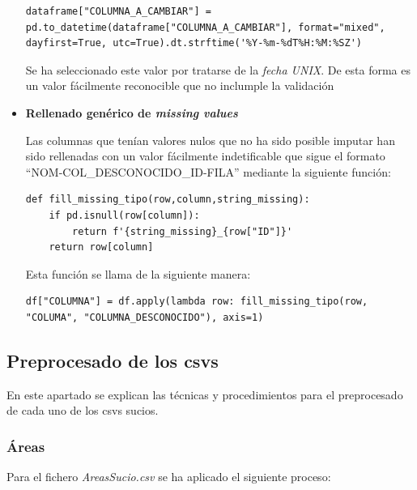 \documentclass[]{article}
\begin{document}
\begin{itemize}
    \begin{lstlisting}
dataframe["COLUMNA_A_CAMBIAR"] = pd.to_datetime(dataframe["COLUMNA_A_CAMBIAR"], format="mixed", dayfirst=True, utc=True).dt.strftime('%Y-%m-%dT%H:%M:%SZ')
    \end{lstlisting}

    Se ha seleccionado este valor por tratarse de la \textit{fecha UNIX}. De
    esta forma es un valor fácilmente reconocible que no inclumple la validación
    \item \textbf{Rellenado genérico de \textit{missing values}}
    
    Las columnas que tenían valores nulos que no ha sido posible imputar han sido rellenadas con un valor fácilmente indetificable que sigue el formato ``NOM-COL\_DESCONOCIDO\_ID-FILA'' mediante la siguiente función:

    \begin{lstlisting}
def fill_missing_tipo(row,column,string_missing):
    if pd.isnull(row[column]):
        return f'{string_missing}_{row["ID"]}'
    return row[column]
    \end{lstlisting}

    Esta función se llama de la siguiente manera:

    \begin{lstlisting}
df["COLUMNA"] = df.apply(lambda row: fill_missing_tipo(row, "COLUMA", "COLUMNA_DESCONOCIDO"), axis=1)
    \end{lstlisting}

\end{itemize}

\subsection{Preprocesado de los csvs}
\label{subsec:preprocessespecifico}
En este apartado se explican las técnicas y procedimientos para el preprocesado de cada uno de los csvs sucios.

\subsubsection{Áreas}
\label{subsubsec:preprocessarea}
Para el fichero \textit{AreasSucio.csv} se ha aplicado el siguiente proceso:
\end{document}
